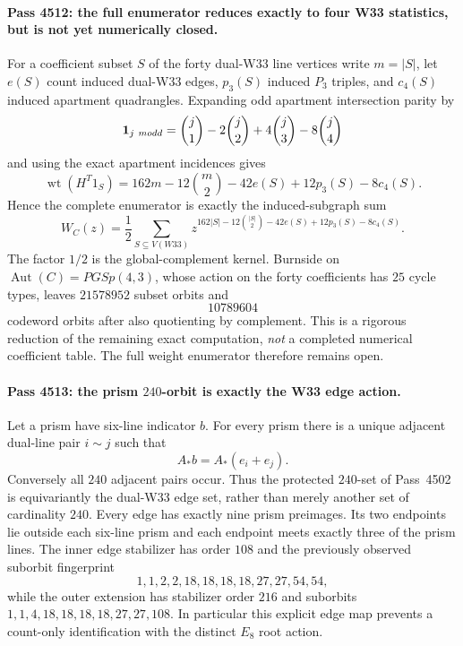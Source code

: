 \paragraph{Pass 4512: the full enumerator reduces exactly to four W33 statistics, but is not yet numerically closed.}
For a coefficient subset $S$ of the forty dual-W33 line vertices write
$m=|S|$, let $e(S)$ count induced dual-W33 edges, $p_3(S)$ induced $P_3$
triples, and $c_4(S)$ induced apartment quadrangles.  Expanding odd apartment
intersection parity by
\[
 {\bf1}_{j\ {
m odd}}={j\choose1}-2{j\choose2}+4{j\choose3}-8{j\choose4}
\]
and using the exact apartment incidences gives
\[
 \boxed{\operatorname{wt}(H^T1_S)
 =162m-12{m\choose2}-42e(S)+12p_3(S)-8c_4(S).}
\]
Hence the complete enumerator is exactly the induced-subgraph sum
\[
 \boxed{W_C(z)=\frac12\sum_{S\subseteq V(W33)}
 z^{162|S|-12{ |S|\choose2}-42e(S)+12p_3(S)-8c_4(S)}.}
\]
The factor $1/2$ is the global-complement kernel.  Burnside on
$\operatorname{Aut}(C)=PGSp(4,3)$, whose action on the forty coefficients has
$25$ cycle types, leaves $21578952$ subset orbits and
\[
 \boxed{10789604}
\]
codeword orbits after also quotienting by complement.  This is a rigorous
reduction of the remaining exact computation, \emph{not} a completed numerical
coefficient table.  The full weight enumerator therefore remains open.

\paragraph{Pass 4513: the prism $240$-orbit is exactly the W33 edge action.}
Let a prism have six-line indicator $b$.  For every prism there is a unique
adjacent dual-line pair $i\sim j$ such that
\[
 \boxed{A_*b=A_*(e_i+e_j).}
\]
Conversely all $240$ adjacent pairs occur.  Thus the protected $240$-set of
Pass~4502 is equivariantly the dual-W33 edge set, rather than merely another
set of cardinality $240$.  Every edge has exactly nine prism preimages.  Its two
endpoints lie outside each six-line prism and each endpoint meets exactly three
of the prism lines.  The inner edge stabilizer has order $108$ and the previously
observed suborbit fingerprint
\[
1,1,2,2,18,18,18,18,27,27,54,54,
\]
while the outer extension has stabilizer order $216$ and suborbits
$1,1,4,18,18,18,18,27,27,108$.  In particular this explicit edge map prevents
a count-only identification with the distinct $E_8$ root action.

